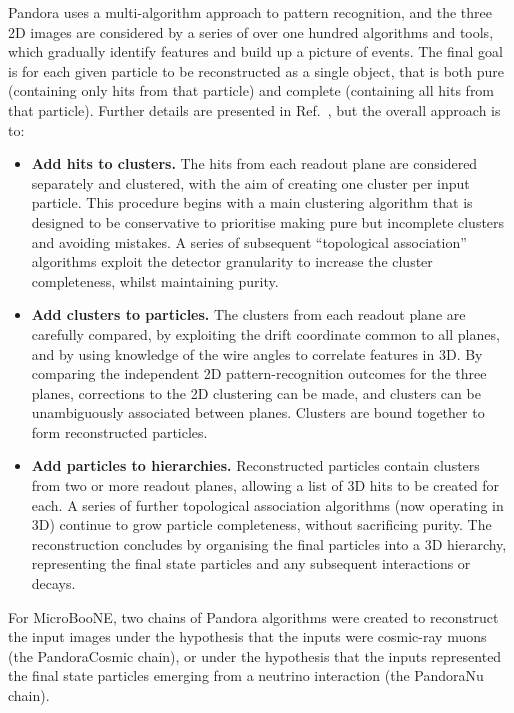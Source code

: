 \documentclass[epjc3]{svjour3}
\begin{document}
Pandora uses a multi-algorithm approach to pattern recognition, and the three 2D images are considered by a series of over one hundred algorithms and tools, which gradually identify features and build up a picture of events. The final goal is for each given particle to be reconstructed as a single object, that is both pure (containing only hits from that particle) and complete (containing all hits from that particle). Further details are presented in Ref.~\cite{pandorauboone}, but the overall approach is to:

\begin{itemize}
    \item \textbf{Add hits to clusters.} The hits from each readout plane are considered separately and clustered, with the aim of creating one cluster per input particle. This procedure begins with a main clustering algorithm that is designed to be conservative to prioritise making pure but incomplete clusters and avoiding mistakes. A series of subsequent ``topological association'' algorithms exploit the detector granularity to increase the cluster completeness, whilst maintaining purity.
    \item \textbf{Add clusters to particles.} The clusters from each readout plane are carefully compared, by exploiting the drift coordinate common to all planes, and by using knowledge of the wire angles to correlate features in 3D. By comparing the independent 2D pattern-recognition outcomes for the three planes, corrections to the 2D clustering can be made, and clusters can be unambiguously associated between planes. Clusters are bound together to form reconstructed particles.
    \item \textbf{Add particles to hierarchies.} Reconstructed particles contain clusters from two or more readout planes, allowing a list of 3D hits to be created for each. A series of further topological association algorithms (now operating in 3D) continue to grow particle completeness, without sacrificing purity. The reconstruction concludes by organising the final particles into a 3D hierarchy, representing the final state particles and any subsequent interactions or decays.
\end{itemize}

For MicroBooNE, two chains of Pandora algorithms were created to reconstruct the input images under the hypothesis that the inputs were cosmic-ray muons (the PandoraCosmic chain), or under the hypothesis that the inputs represented the final state particles emerging from a neutrino interaction (the PandoraNu chain).
\end{document}
